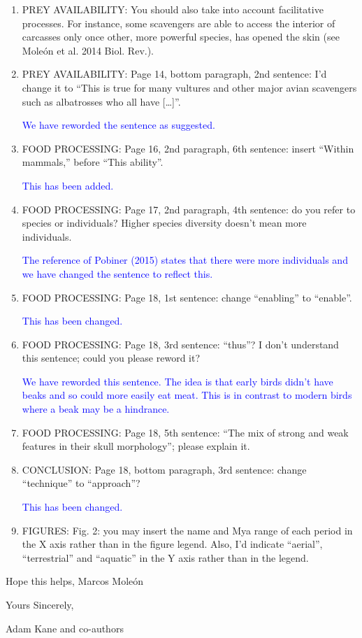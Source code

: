 \documentclass[12pt,letterpaper]{article}
\begin{document}
\begin{enumerate}
\item{PREY AVAILABILITY:} You should also take into account facilitative processes. For instance, some scavengers are able to access the interior of carcasses only once other, more powerful species, has opened the skin (see Mole\'{o}n et al. 2014 Biol. Rev.).

\item{PREY AVAILABILITY:} Page 14, bottom paragraph, 2nd sentence: I'd change it to ``This is true for many vultures and other major avian scavengers such as albatrosses who all have […]''.

\textcolor{blue}{We have reworded the sentence as suggested.}

\item{FOOD PROCESSING:} Page 16, 2nd paragraph, 6th sentence: insert ``Within mammals,'' before ``This ability''.

\textcolor{blue}{This has been added.}

\item{FOOD PROCESSING:} Page 17, 2nd paragraph, 4th sentence: do you refer to species or individuals? Higher species diversity doesn't mean more individuals.

\textcolor{blue}{The reference of Pobiner (2015) states that there were more individuals and we have changed the sentence to reflect this.}

\item{FOOD PROCESSING:} Page 18, 1st sentence: change ``enabling'' to ``enable''.

\textcolor{blue}{This has been changed.}

\item{FOOD PROCESSING:} Page 18, 3rd sentence: ``thus''? I don't understand this sentence; could you please reword it?

\textcolor{blue}{We have reworded this sentence. The idea is that early birds didn't have beaks and so could more easily eat meat. This is in contrast to modern birds where a beak may be a hindrance.}

\item{FOOD PROCESSING:} Page 18, 5th sentence: ``The mix of strong and weak features in their skull morphology''; please explain it.

\item{CONCLUSION:} Page 18, bottom paragraph, 3rd sentence: change ``technique'' to ``approach''?

\textcolor{blue}{This has been changed.}

\item{FIGURES:} Fig. 2: you may insert the name and Mya range of each period in the X axis rather than in the figure legend. Also, I'd indicate ``aerial'', ``terrestrial'' and ``aquatic'' in the Y axis rather than in the legend.

\end{enumerate}

Hope this helps,
Marcos Mole\'{o}n

\bigskip
Yours Sincerely,

Adam Kane and co-authors 
\end{document}
